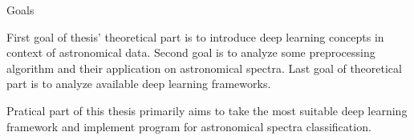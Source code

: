 \chap Goals

First goal of thesis' theoretical part is to introduce deep learning concepts
in context of astronomical data. Second goal is to analyze some preprocessing
algorithm and their application on astronomical spectra. Last goal of
theoretical part is to analyze available deep learning frameworks.

Pratical part of this thesis primarily aims to take the most suitable deep
learning framework and implement program for astronomical spectra
classification.
